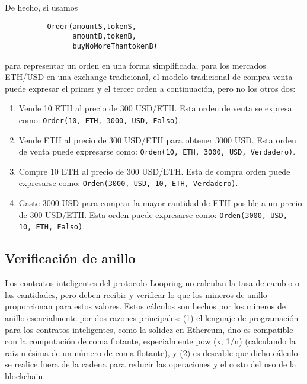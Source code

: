 \documentclass[UTF8,nofonts]{article}
\begin{document}
\begin{multicols}{2}
De hecho, si usamos


\begin{verbatim}
	      Order(amountS,tokenS,
	            amountB,tokenB,
	            buyNoMoreThantokenB)
\end{verbatim}

para representar un orden en una forma simplificada, para los mercados ETH/USD en una exchange tradicional, el modelo tradicional de compra-venta puede expresar el primer y el tercer orden a continuaci\'on, pero no los otros dos:

\begin{enumerate}
	\item Vende 10 ETH al precio de 300 USD/ETH. Esta orden de venta se expresa como: \verb|Order(10, ETH, 3000, USD, Falso)|.
	\item Vende ETH al precio de 300 USD/ETH para obtener 3000 USD. Esta orden de venta puede expresarse como: \verb|Orden(10, ETH, 3000, USD, Verdadero)|.
	\item Compre 10 ETH al precio de 300 USD/ETH. Esta de compra orden puede expresarse como: 
	\verb|Orden(3000, USD, 10, ETH, Verdadero)|.
	\item Gaste 3000 USD para comprar la mayor cantidad de ETH posible a un precio de 300 USD/ETH. Esta orden puede expresarse como: \verb|Orden(3000, USD, 10, ETH, Falso)|.
\end{enumerate}

\subsection{Verificaci\'on de anillo\label{sec:ring_verification}}

Los contratos inteligentes del protocolo Loopring no calculan la tasa de cambio o las cantidades, pero deben recibir y verificar lo que los mineros de anillo proporcionan para estos valores. Estos c\'alculos son hechos por los mineros de anillo esencialmente por dos razones principales: (1) el lenguaje de programaci\'on para los contratos inteligentes, como la solidez\cite{dannen2017introducing} en Ethereum, dno es compatible con la computaci\'on de coma flotante, especialmente pow (x, 1/n) (calculando la ra\'iz n-\'esima de un n\'umero de coma flotante), y (2) es deseable que dicho c\'alculo se realice fuera de la cadena para reducir las operaciones y el costo del uso de la blockchain.


\end{multicols}
\end{document}
